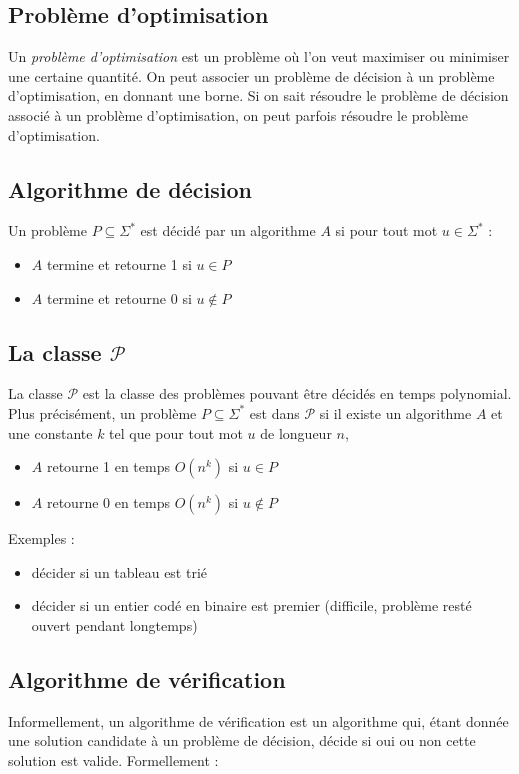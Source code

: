 \documentclass[a4paper]{article}
\begin{document}
  \subsection{Problème d'optimisation}
  Un \textit{problème d'optimisation} est un problème où l'on veut maximiser ou
  minimiser une certaine quantité. On peut associer un problème de décision à un
  problème d'optimisation, en donnant une borne. Si on sait résoudre le problème
  de décision associé à un problème d'optimisation, on peut parfois résoudre le
  problème d'optimisation.

  \subsection{Algorithme de décision}
  Un problème $P \subseteq \Sigma^*$ est décidé par un algorithme $A$ si pour 
  tout mot $u \in \Sigma^*$ : 
  \begin{itemize}
    \item $A$ termine et retourne 1 si $u \in P$
    \item $A$ termine et retourne 0 si $u \not \in P$
  \end{itemize}

  \subsection{La classe $\mathcal{P}$}
  La classe $\mathcal{P}$ est la classe des problèmes pouvant être décidés en temps
  polynomial. Plus précisément, un problème $P \subseteq \Sigma^*$ est dans $\mathcal{P}$
  si il existe un algorithme $A$ et une constante $k$ tel que pour tout mot $u$
  de longueur $n$, 
  \begin{itemize}
    \item $A$ retourne 1 en temps $O(n^k)$ si $u \in P$
    \item $A$ retourne 0 en temps $O(n^k)$ si $u \not \in P$
  \end{itemize}

  Exemples :
  \begin{itemize}
    \item décider si un tableau est trié
    \item décider si un entier codé en binaire est premier (difficile, problème
    resté ouvert pendant longtemps)
  \end{itemize}

  \subsection{Algorithme de vérification}
  Informellement, un algorithme de vérification est un algorithme qui, étant donnée
  une solution candidate à un problème de décision, décide si oui ou non cette
  solution est valide. Formellement : \\
\end{document}
